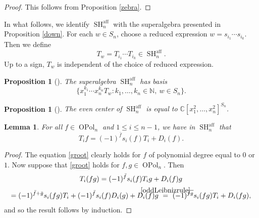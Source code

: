 \documentclass[11pt]{amsart}
\newtheorem{prop}[theo]{Proposition}
\newtheorem{lem}[theo]{Lemma}
\theoremstyle{definition}
\numberwithin{equation}{section}
\begin{document}
\begin{proof}
This follows from Proposition \ref{zebra}.
\end{proof}

In what follows, we identify $ \operatorname{SH}^{\operatorname{aff}}_{n} $ with the superalgebra presented in Proposition \ref{down}. For each $ w \in S_{n} $, choose a reduced expression $ w = s_{i_{1}}\cdots s_{i_{k}} $. Then we define
\begin{equation*}
T_{w} = T_{i_{1}}\cdots T_{i_{k}} \in \operatorname{SH}^{\operatorname{aff}}_{n}.
\end{equation*}
Up to a sign, $ T_{w} $ is independent of the choice of reduced expression.


\begin{prop}[{\cite[Prop.~3.4(1)]{Wang}}] \label{cell}
The superalgebra $ \operatorname{SH}^{\operatorname{aff}}_{n} $ has basis
\begin{equation*}
\{x_{1}^{k_{1}} \cdots x_{n}^{k_{n}} T_{w} : k_{1},\ldots,k_{n} \in \mathbb{N}, \ w \in S_{n}\}.
\end{equation*}
\end{prop}

\begin{prop}[{\cite[Prop.~3.4(3)]{Wang}}] \label{middle}
The even center of $ \operatorname{SH}^{\operatorname{aff}}_{n} $ is equal to $ \mathbb{C}[x_{1}^{2},\ldots,x_{n}^{2}]^{S_{n}} $.
\end{prop}


\begin{lem}
For all $ f \in \operatorname{OPol}_{n} $ and $ 1 \leq i \leq n-1 $, we have in $ \operatorname{SH}^{\operatorname{aff}}_{n} $ that
\begin{equation} \label{groot}
T_{i}f = (-1)^{\bar{f}}s_{i}(f)T_{i} + D_{i}(f).
\end{equation}
\end{lem}

\begin{proof}
The equation \cref{groot} clearly holds for $ f $ of polynomial degree equal to \(0\) or \(1\). Now suppose that \cref{groot} holds for $ f,g \in \operatorname{OPol}_{n} $. Then
\begin{multline*}
T_{i}(fg) = (-1)^{\bar{f}}s_{i}(f)T_{i}g + D_{i}(f)g \\ = (-1)^{\bar{f}+\bar{g}}s_{i}(fg)T_{i} + (-1)^{\bar{f}}s_{i}(f)D_{i}(g) + D_{i}(f)g \ \stackrel{\mathclap{\cref{oddLeibnizrule}}}{=} \ (-1)^{\overline{fg}}s_{i}(fg)T_{i} + D_{i}(fg),
\end{multline*}
and so the result follows by induction.
\end{proof}
\end{document}
